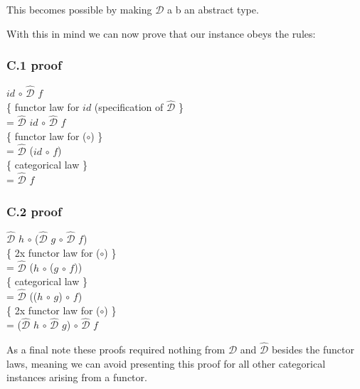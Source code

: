 \documentclass[11pt,a4]{article}
\newcommand{\Varid}[1]{\mathit{#1}}
\theoremstyle{definition}
\theoremstyle{Definition}
\theoremstyle{Definition}
\begin{document}
This becomes possible by making \ensuremath{\mathcal{D}} a b an abstract type.

With this in mind we can now prove that our instance obeys the rules:

\subsubsection{C.1 proof}

\ensuremath{\Varid{id}} $\circ$ \ensuremath{\mathcal{\hat{D}}} \ensuremath{\Varid{f}} \\
\{ functor law for \ensuremath{\Varid{id}} (specification of \ensuremath{\mathcal{\hat{D}}} \}\\
= \ensuremath{\mathcal{\hat{D}}} \ensuremath{\Varid{id}} $\circ$ \ensuremath{\mathcal{\hat{D}}} \ensuremath{\Varid{f}}\ \\
\{ functor law for ($\circ$) \}\\
= \ensuremath{\mathcal{\hat{D}}} (\ensuremath{\Varid{id}} $\circ$ \ensuremath{\Varid{f}}) \\
\{ categorical law \}\\
= \ensuremath{\mathcal{\hat{D}}} \ensuremath{\Varid{f}} 


\subsubsection{C.2 proof}

\ensuremath{\mathcal{\hat{D}}} \ensuremath{\Varid{h}} $\circ$ (\ensuremath{\mathcal{\hat{D}}} \ensuremath{\Varid{g}} $\circ$ \ensuremath{\mathcal{\hat{D}}} \ensuremath{\Varid{f}})\\
\{ 2x functor law for ($\circ$) \}\\
= \ensuremath{\mathcal{\hat{D}}} (\ensuremath{\Varid{h}} $\circ$ (\ensuremath{\Varid{g}} $\circ$ \ensuremath{\Varid{f}}))\\ 
\{ categorical law \}\\
= \ensuremath{\mathcal{\hat{D}}} ((\ensuremath{\Varid{h}} $\circ$ \ensuremath{\Varid{g}}) $\circ$ \ensuremath{\Varid{f}})\\
\{ 2x functor law for ($\circ$) \}\\
= (\ensuremath{\mathcal{\hat{D}}} \ensuremath{\Varid{h}} $\circ$ \ensuremath{\mathcal{\hat{D}}} \ensuremath{\Varid{g}}) $\circ$ \ensuremath{\mathcal{\hat{D}}} \ensuremath{\Varid{f}}

As a final note these proofs required nothing from \ensuremath{\mathcal{D}} and \ensuremath{\mathcal{\hat{D}}} besides the functor laws, meaning we can avoid presenting this proof for all other categorical instances arising from a functor.
\end{document}
